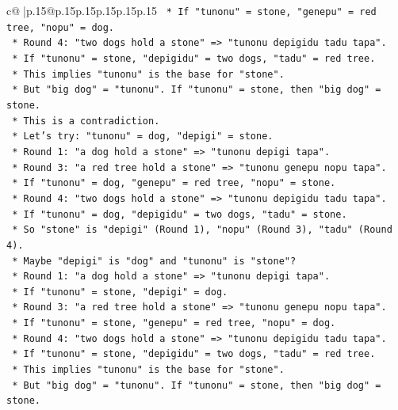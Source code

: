 \documentclass{article}
\begin{document}
{\begin{supertabular}{c@{$\;$}|p{.15\linewidth}@{}p{.15\linewidth}p{.15\linewidth}p{.15\linewidth}p{.15\linewidth}p{.15\linewidth}}
{{{\texttt{        *   If "tunonu" = stone, "genepu" = red tree, "nopu" = dog.} \\
\texttt{        *   Round 4: "two dogs hold a stone" => "tunonu depigidu tadu tapa".} \\
\texttt{        *   If "tunonu" = stone, "depigidu" = two dogs, "tadu" = red tree.} \\
\texttt{        *   This implies "tunonu" is the base for "stone".} \\
\texttt{        *   But "big dog" = "tunonu". If "tunonu" = stone, then "big dog" = stone.} \\
\texttt{        *   This is a contradiction.} \\
\texttt{        *   Let's try: "tunonu" = dog, "depigi" = stone.} \\
\texttt{        *   Round 1: "a dog hold a stone" => "tunonu depigi tapa".} \\
\texttt{        *   Round 3: "a red tree hold a stone" => "tunonu genepu nopu tapa".} \\
\texttt{        *   If "tunonu" = dog, "genepu" = red tree, "nopu" = stone.} \\
\texttt{        *   Round 4: "two dogs hold a stone" => "tunonu depigidu tadu tapa".} \\
\texttt{        *   If "tunonu" = dog, "depigidu" = two dogs, "tadu" = stone.} \\
\texttt{        *   So "stone" is "depigi" (Round 1), "nopu" (Round 3), "tadu" (Round 4).} \\
\texttt{        *   Maybe "depigi" is "dog" and "tunonu" is "stone"?} \\
\texttt{        *   Round 1: "a dog hold a stone" => "tunonu depigi tapa".} \\
\texttt{        *   If "tunonu" = stone, "depigi" = dog.} \\
\texttt{        *   Round 3: "a red tree hold a stone" => "tunonu genepu nopu tapa".} \\
\texttt{        *   If "tunonu" = stone, "genepu" = red tree, "nopu" = dog.} \\
\texttt{        *   Round 4: "two dogs hold a stone" => "tunonu depigidu tadu tapa".} \\
\texttt{        *   If "tunonu" = stone, "depigidu" = two dogs, "tadu" = red tree.} \\
\texttt{        *   This implies "tunonu" is the base for "stone".} \\
\texttt{        *   But "big dog" = "tunonu". If "tunonu" = stone, then "big dog" = stone.} \\
}}}
\end{supertabular}}
\end{document}
